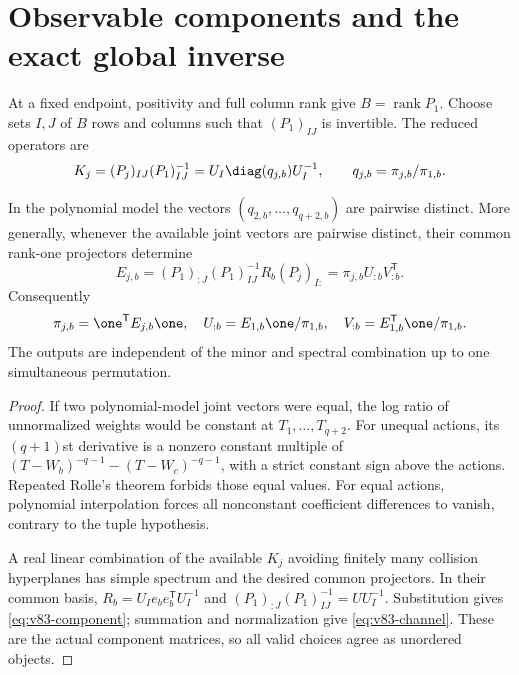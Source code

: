 \section{Observable components and the exact global inverse}
\label{sec:v83-components}
At a fixed endpoint, positivity and full column rank give
$B=\operatorname{rank}P_1$. Choose sets $I,J$ of $B$ rows and columns
such that $(P_1)_{IJ}$ is invertible. The reduced operators are
\begin{equation}\label{eq:v83-operators}
 K_j=(P_j)_{IJ}(P_1)_{IJ}^{-1}
 =U_I\diag(q_{j,b})U_I^{-1},\qquad q_{j,b}=\pi_{j,b}/\pi_{1,b}.
\end{equation}
\begin{lemma}
\label{lem:v83-components}
In the polynomial model the vectors $(q_{2,b},\ldots,q_{q+2,b})$ are
pairwise distinct. More generally, whenever the available joint vectors
are pairwise distinct, their common rank-one projectors determine
\begin{equation}\label{eq:v83-component}
 E_{j,b}=(P_1)_{:J}(P_1)_{IJ}^{-1}R_b(P_j)_{I:}
        =\pi_{j,b}U_{:b}V_{:b}^{\mathsf T}.
\end{equation}
Consequently
\begin{equation}\label{eq:v83-channel}
 \pi_{j,b}=\one^{\mathsf T}E_{j,b}\one,\quad
 U_{:b}=E_{1,b}\one/\pi_{1,b},\quad
 V_{:b}=E_{1,b}^{\mathsf T}\one/\pi_{1,b}.
\end{equation}
The outputs are independent of the minor and spectral combination up
to one simultaneous permutation.
\end{lemma}
\begin{proof}
If two polynomial-model joint vectors were equal, the log ratio of
unnormalized weights would be constant at $T_1,\ldots,T_{q+2}$.
For unequal actions, its $(q+1)$st derivative is a nonzero constant
multiple of $(T-W_b)^{-q-1}-(T-W_c)^{-q-1}$, with a strict constant
sign above the actions. Repeated Rolle's theorem forbids those equal
values. For equal actions, polynomial interpolation forces all
nonconstant coefficient differences to vanish, contrary to the tuple
hypothesis.

A real linear combination of the available $K_j$ avoiding finitely many
collision hyperplanes has simple spectrum and the desired common
projectors. In their common basis,
$R_b=U_Ie_be_b^{\mathsf T}U_I^{-1}$ and
$(P_1)_{:J}(P_1)_{IJ}^{-1}=UU_I^{-1}$. Substitution gives
\eqref{eq:v83-component}; summation and normalization give
\eqref{eq:v83-channel}. These are the actual component matrices, so
all valid choices agree as unordered objects.
\end{proof}

